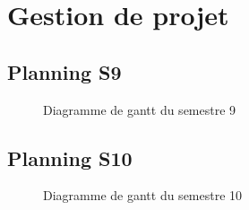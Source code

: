 \documentclass[debug,nodate,hideweeklyreports]{polytech/polytech}
\begin{document}
\chapter{Gestion de projet}
\label{ann:chap4}
\section{Planning S9}

\begin{figure}
  \caption{Diagramme de gantt du semestre 9}
  \label{fig:gantts9}
\end{figure}

\section{Planning S10}

\begin{figure}
  \caption{Diagramme de gantt du semestre 10}
  \label{fig:gantts10}
\end{figure}
\end{document}
